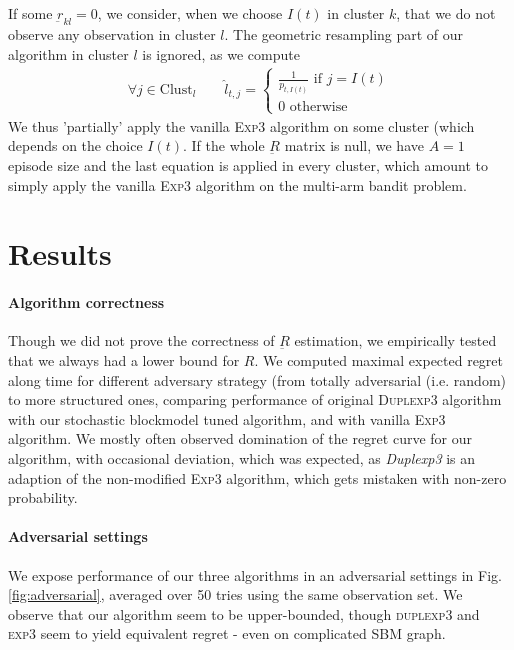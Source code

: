 \documentclass[11pt,a4paper]{article}
\begin{document}
If some $\underbar{r}_{kl}=0$, we consider, when we choose $I(t)$ in cluster $k$, that we do not observe any observation in cluster $l$. The geometric resampling part of our algorithm in cluster $l$ is ignored, as we compute
\begin{align*}
\forall j \in \mathrm{Clust}_l\qquad
\hat l_{t,j} = \left\{
\begin{array}{c}
\frac{1}{p_{t,I(t)}} \text{ if } j = I(t)\\
0\text{ otherwise}
\end{array}
\right.
\end{align*}
We thus 'partially' apply the vanilla \textsc{Exp3} algorithm on some cluster (which depends on the choice $I(t)$. If the whole $\underbar{R}$ matrix is null, we have $A = 1$ episode size and the last equation is applied in every cluster, which amount to simply apply the vanilla \textsc{Exp3} algorithm on the multi-arm bandit problem.

\section{Results}

\paragraph{Algorithm correctness}Though we did not prove the correctness of $\underbar{R}$ estimation, we empirically tested that we always had a lower bound for $R$. We computed maximal expected regret along time for different adversary strategy (from totally adversarial (i.e. random) to more structured ones, comparing performance of original \textsc{Duplexp3} algorithm with our stochastic blockmodel tuned algorithm, and with vanilla \textsc{Exp3} algorithm. We mostly often observed domination of the regret curve for our algorithm, with occasional deviation, which was expected, as \textit{Duplexp3} is an adaption of the non-modified \textsc{Exp3} algorithm, which gets mistaken with non-zero probability.


\paragraph{Adversarial settings}We expose performance of our three algorithms in an adversarial settings in Fig. \ref{fig:adversarial}, averaged over 50 tries using the same observation set. We observe that our algorithm seem to be upper-bounded, though \textsc{duplexp3} and \textsc{exp3} seem to yield equivalent regret - even on complicated SBM graph.
\end{document}
